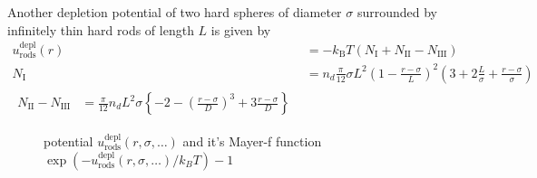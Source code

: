 Another depletion potential of two hard spheres of diameter $\sigma$ surrounded
by infinitely thin hard rods of length $L$ is given by
\begin{align}
u^\text{depl}_\text{rods}(r) &= -k_\text{B} T (N_\text{I}+N_\text{II}-N_\text{III}) \\
N_\text{I} &= n_d \frac{\pi}{12}\sigma L^2 \left(1-\frac{r-\sigma}{L}\right)^2
                \left(3+2\frac{L}{\sigma}+\frac{r-\sigma}{\sigma}\right)\\
\begin{split}
N_\text{II} - N_\text{III} &= \frac{\pi}{12} n_d L^2\sigma
                              \left\{ -2
                                      -\left(\frac{r-\sigma}{D}\right)^3
                                      +3\frac{r-\sigma}{D}\right\}
\end{split}
\end{align}

\begin{figure}[htb]
\centering
  \quad
  \caption{potential $u^\text{depl}_\text{rods}(r,\sigma,\ldots)$ and it's Mayer-f function $\exp(-u^\text{depl}_\text{rods}(r,\sigma,\ldots)/k_BT)-1$}
\end{figure}

\newpage
